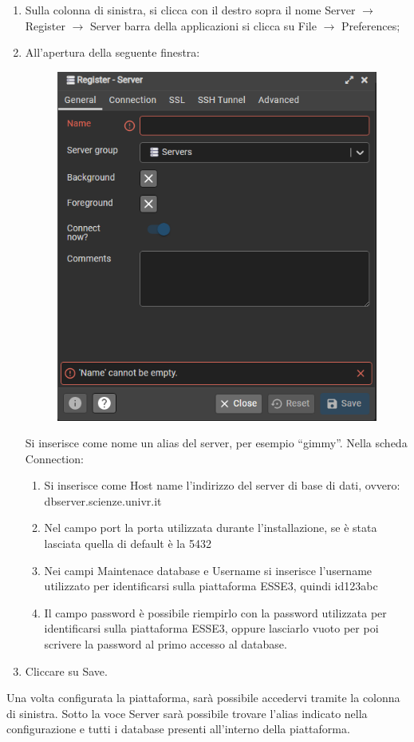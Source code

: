 \documentclass[a4paper]{article}
\newcommand{\dquotes}[1]{``#1''}
\begin{document}
	\begin{enumerate}
		\item Sulla colonna di sinistra, si clicca con il destro sopra il nome Server $\rightarrow$ \textsf{Register} $\rightarrow$ \textsf{Server} barra della applicazioni si clicca su \textsf{File} $\rightarrow$ \textsf{Preferences};
		
		\item All'apertura della seguente finestra:
		\begin{figure}[!htp]
			\centering
			\includegraphics[width=.7\textwidth]{img/lab/installazione.png}
		\end{figure}
		
		\noindent
		Si inserisce come nome un alias del server, per esempio \dquotes{gimmy}.\newline
		Nella scheda \textsf{Connection}:
		\begin{enumerate}
			\item Si inserisce come Host name l'indirizzo del server di base di dati, ovvero: \textsf{dbserver.scienze.univr.it}
			\item Nel campo \textsf{port} la porta utilizzata durante l'installazione, se è stata lasciata quella di default è la \textsf{5432}
			\item Nei campi \textsf{Maintenace database} e \textsf{Username} si inserisce l'username utilizzato per identificarsi sulla piattaforma ESSE3, quindi \textsf{id123abc}
			\item Il campo \textsf{password} è possibile riempirlo con la password utilizzata per identificarsi sulla piattaforma ESSE3, oppure lasciarlo vuoto per poi scrivere la password al primo accesso al database.
		\end{enumerate}
		
		\item Cliccare su \textsf{Save}.
	\end{enumerate}
	Una volta configurata la piattaforma, sarà possibile accedervi tramite la colonna di sinistra. Sotto la voce \textsf{Server} sarà possibile trovare l'alias indicato nella configurazione e tutti i database presenti all'interno della piattaforma.\newline
	
\end{document}
